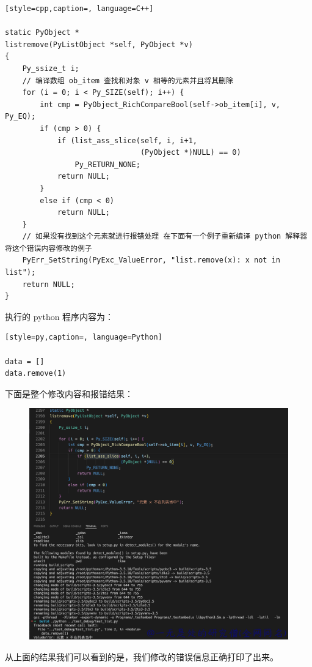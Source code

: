 \begin{lstlisting}[style=cpp,caption=, language=C++]

static PyObject *
listremove(PyListObject *self, PyObject *v)
{
    Py_ssize_t i;
  	// 编译数组 ob_item 查找和对象 v 相等的元素并且将其删除
    for (i = 0; i < Py_SIZE(self); i++) {
        int cmp = PyObject_RichCompareBool(self->ob_item[i], v, Py_EQ);
        if (cmp > 0) {
            if (list_ass_slice(self, i, i+1,
                               (PyObject *)NULL) == 0)
                Py_RETURN_NONE;
            return NULL;
        }
        else if (cmp < 0)
            return NULL;
    }
  	// 如果没有找到这个元素就进行报错处理 在下面有一个例子重新编译 python 解释器 将这个错误内容修改的例子
    PyErr_SetString(PyExc_ValueError, "list.remove(x): x not in list");
    return NULL;
}
\end{lstlisting}
执行的 python 程序内容为：
\begin{lstlisting}[style=py,caption=, language=Python]

data = []
data.remove(1)
\end{lstlisting}
下面是整个修改内容和报错结果：

    \begin{figure}[h]
        \centering
            \includegraphics[scale=.2]{images/06-list.png}
            \caption{ }
        \label{fig:my_label}
    \end{figure}
    
从上面的结果我们可以看到的是，我们修改的错误信息正确打印了出来。
